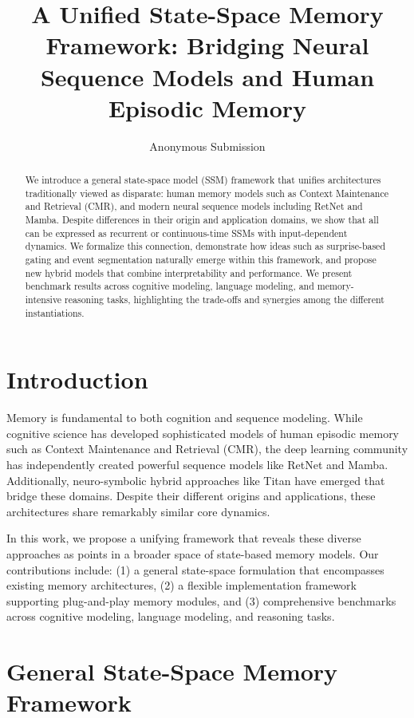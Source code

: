 \documentclass[11pt]{article}
\title{A Unified State-Space Memory Framework: Bridging Neural Sequence Models and Human Episodic Memory}
\author{
Anonymous Submission
}
\date{}
\begin{document}
\maketitle

\begin{abstract}
We introduce a general state-space model (SSM) framework that unifies architectures traditionally viewed as disparate: human memory models such as Context Maintenance and Retrieval (CMR), and modern neural sequence models including RetNet and Mamba. Despite differences in their origin and application domains, we show that all can be expressed as recurrent or continuous-time SSMs with input-dependent dynamics. We formalize this connection, demonstrate how ideas such as surprise-based gating and event segmentation naturally emerge within this framework, and propose new hybrid models that combine interpretability and performance. We present benchmark results across cognitive modeling, language modeling, and memory-intensive reasoning tasks, highlighting the trade-offs and synergies among the different instantiations.
\end{abstract}

\section{Introduction}

Memory is fundamental to both cognition and sequence modeling. While cognitive science has developed sophisticated models of human episodic memory such as Context Maintenance and Retrieval (CMR), the deep learning community has independently created powerful sequence models like RetNet and Mamba. Additionally, neuro-symbolic hybrid approaches like Titan have emerged that bridge these domains. Despite their different origins and applications, these architectures share remarkably similar core dynamics.

In this work, we propose a unifying framework that reveals these diverse approaches as points in a broader space of state-based memory models. Our contributions include: (1) a general state-space formulation that encompasses existing memory architectures, (2) a flexible implementation framework supporting plug-and-play memory modules, and (3) comprehensive benchmarks across cognitive modeling, language modeling, and reasoning tasks.

\section{General State-Space Memory Framework}
\end{document}
